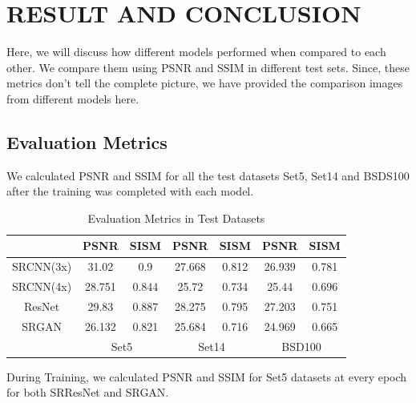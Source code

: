 \newpage
\section{RESULT AND CONCLUSION}
Here, we will discuss how different models performed when compared to each other. We compare them using PSNR and SSIM in different test sets. Since, these metrics don't tell the complete picture, we have provided the comparison images from different models here.
\subsection{Evaluation Metrics}
We calculated PSNR and SSIM for all the test datasets Set5, Set14 and BSDS100 after the training was completed with each model.
\begin{table}[h]
    \centering
    \begin{tabular}{|c|c|c|c|c|c|c|}
    \hline
    &PSNR & SISM & PSNR & SISM & PSNR & SISM \\
    \hline
    SRCNN(3x)&31.02 & 0.9 & 27.668 & 0.812 & 26.939 & 0.781 \\
    \hline
    SRCNN(4x)&28.751 & 0.844 & 25.72 & 0.734 & 25.44 & 0.696 \\
    \hline
    ResNet&29.83 & 0.887 & 28.275 & 0.795 & 27.203 & 0.751 \\
    \hline
    SRGAN &26.132 & 0.821 &25.684 & 0.716 & 24.969 & 0.665 \\
    \hline
    & \multicolumn{2}{|c|}{Set5}& \multicolumn{2}{|c|}{Set14} & \multicolumn{2}{|c|}{BSD100} \\
    \hline
    \end{tabular}
    \caption{Evaluation Metrics in Test Datasets}
\end{table}
\clearpage
During Training, we calculated PSNR and SSIM for Set5 datasets at every epoch for both SRResNet and SRGAN.
